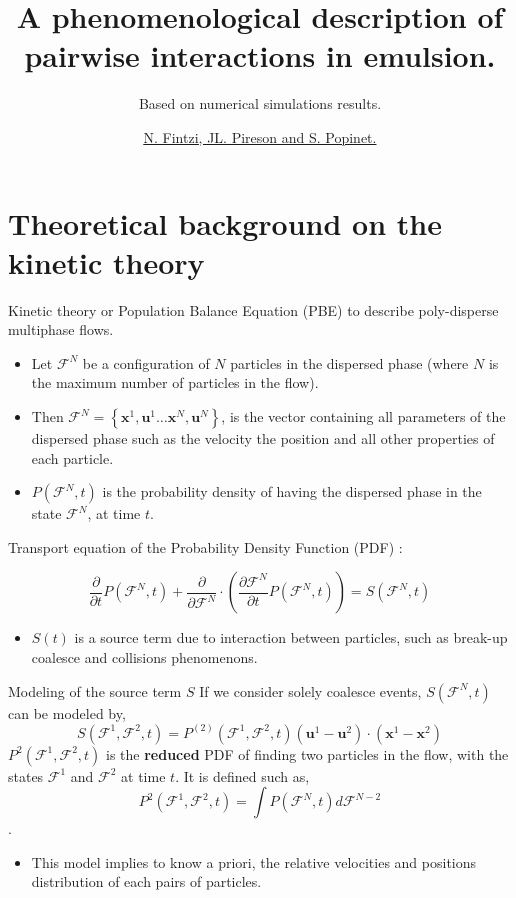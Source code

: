 \documentclass{sintefbeamer}
\title{A phenomenological description of pairwise interactions in emulsion.}
\subtitle{Based on numerical simulations results.}
\author{\href{http://basilisk.fr/sandbox/fintzin/Rising-Suspenion/RS.c}{\underline{N. Fintzi}, JL. Pireson and S. Popinet. }}
\newcommand{\pddt}{\frac{\partial}{\partial t}}
\begin{document}
\maketitle
\section{Theoretical background on the kinetic theory}

\begin{frame}{Kinetic theory or Population Balance Equation (PBE) to describe poly-disperse multiphase flows.}
  \begin{definition}
    \begin{itemize}
      \item Let $\mathcal{F}^N$ be a configuration of $N$ particles in the dispersed phase (where $N$ is the maximum number of particles in the flow).  
      \item Then $\mathcal{F}^N = \left\{\textbf{x}^1,\textbf{u}^1\ldots \textbf{x}^N,\textbf{u}^N\right\}$, is the vector containing all parameters of the dispersed phase such as the velocity the position and all other properties of each particle.  
      \item $P(\mathcal{F}^N,t)$ is the probability density of having the dispersed phase in the state $\mathcal{F}^N$, at time $t$. 
    \end{itemize}
  \end{definition}

  Transport equation of the Probability Density Function (PDF) :

  \begin{equation*}
    \pddt P(\mathcal{F}^N,t) 
    + \frac{\partial}{\partial \mathcal{F}^N} \cdot \left(
      \frac{\partial \mathcal{F}^N}{\partial t} P(\mathcal{F}^N,t)
    \right)
    = S(\mathcal{F}^N,t) 
  \end{equation*}
  \begin{itemize}
    \item $S(t)$ is a source term due to interaction between particles, such as break-up coalesce and collisions phenomenons. 
  \end{itemize}
\end{frame}

\begin{frame}{Modeling of the source term $S$}
  If we consider solely coalesce events, $S(\mathcal{F}^N,t)$ can be modeled by,
  \begin{equation*}
    S(\mathcal{F}^1,\mathcal{F}^2,t) 
    =  P^{(2)}(\mathcal{F}^{1},\mathcal{F}^{2},t) (\textbf{u}^1 - \textbf{u}^2)\cdot (\textbf{x}^1 - \textbf{x}^2) 
  \end{equation*} 
$P^2(\mathcal{F}^1,\mathcal{F}^2 ,t)$ is the \textbf{reduced} PDF of finding two particles in the flow, with the states $\mathcal{F}^1$ and $\mathcal{F}^2$ at time $t$. 
It is defined such as, 
  $$P^2(\mathcal{F}^1,\mathcal{F}^2 ,t) = \int P(\mathcal{F}^N ,t) d\mathcal{F}^{N-2}$$.
\begin{itemize}
  \item This model implies to know a priori, the relative velocities and positions distribution of each pairs of particles. 
\end{itemize}
\end{frame}
\end{document}
